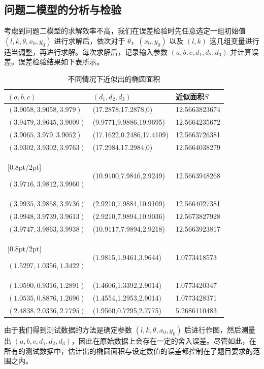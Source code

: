 \documentclass[a4paper,10.5pt]{ctexart}
\begin{document}
\subsection{问题二模型的分析与检验}
\par 考虑到问题二模型的求解效率不高，我们在误差检验时先任意选定一组初始值 $(l,k,\theta,x_0,y_0)$ 进行求解后，依次对于 $\theta$，$(x_0,y_0)$ 以及 $(l,k)$ 这几组变量进行适当调整，再进行求解。每次求解后，记录输入参数 $(a,b,c,d_1,d_2,d_3)$ 并计算误差。误差检验结果如下表所示。
\begin{table}[h]
\centering
\caption{不同情况下近似出的椭圆面积}
\begin{tabular}{C{5cm}C{5cm}C{3cm}}
\toprule[2pt]
\textbf{$(a,b,c)$}   & \textbf{$(d_1,d_2,d_3)$}      &  \textbf{近似面积$S$}  \\\midrule[1pt]
$(3.9058,3.9058,3.979)$   & (17.2878,17.2878,0)  & 12.5663823674 \\
$(3.9479,3.9645,3.9009)$  & (9.9771,9.9886,19.9695)     & 12.5664235672 \\
$(3.9065,3.979,3.9052)$ & (17.1622,0.2486,17.4109)  & 12.5663726381 \\
$(3.9302,3.9302,3.9763)$  & (17.2984,17.2984,0)  & 12.5664038279 \\[0.8pt/2pt]

$(3.9716,3.9812,3.9960)$   & (10.9100,7.9846,2.9249) & 12.5663948268 \\
$(3.9935,3.9858,3.9736)$     & (2.9210,7.9884,10.9109)  & 12.5664027381 \\
$(3.9948,3.9739,3.9613)$    &  (2.9210,7.9894,10.9036) &  12.5673827928 \\
$(3.9747,3.9863,3.9938)$      &    (10.9117,7.9894,2.9218)  &   12.5663923817         \\[0.8pt/2pt]

$(1.5297,1.0356,1.3422)$    &  (1.9815,1.9461,3.9644)  &  1.0773418573   \\
$(1.0590,0.9316,1.2891)$      &     (1.4606,1.3392,2.9014)&  1.0773420347 \\
$(1.0535,0.8876,1.2696)$    &   (1.4554,1.2953,2.9014)     & 1.0773428371 \\
$(2.4838,2.0336,2.7795)$      &    (1.9560,0.7295,2.7775)     &   5.2686110483\\

\bottomrule[2pt]
\end{tabular}
\label{tab:wei1}
\end{table}
\par 由于我们得到测试数据的方法是确定参数 $(l,k,\theta,x_0,y_0)$ 后进行作图，然后测量出 $(a,b,c,d_1,d_2,d_3)$，因此在原始数据上会存在一定的舍入误差。尽管如此，在所有的测试数据中，估计出的椭圆面积与设定数值的误差都控制在了题目要求的范围之内。
\end{document}
